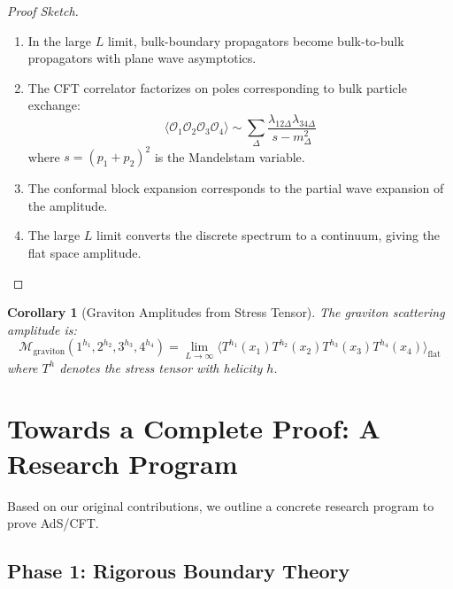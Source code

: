 \documentclass[12pt,a4paper]{article}
\newtheorem{corollary}[theorem]{Corollary}
\begin{document}
\begin{proof}[Proof Sketch]
\begin{enumerate}
    \item In the large $L$ limit, bulk-boundary propagators become bulk-to-bulk propagators with plane wave asymptotics.
    
    \item The CFT correlator factorizes on poles corresponding to bulk particle exchange:
    \begin{equation}
    \langle \mathcal{O}_1 \mathcal{O}_2 \mathcal{O}_3 \mathcal{O}_4 \rangle \sim \sum_{\Delta} \frac{\lambda_{12\Delta}\lambda_{34\Delta}}{s - m_\Delta^2}
    \end{equation}
    where $s = (p_1 + p_2)^2$ is the Mandelstam variable.
    
    \item The conformal block expansion corresponds to the partial wave expansion of the amplitude.
    
    \item The large $L$ limit converts the discrete spectrum to a continuum, giving the flat space amplitude.
\end{enumerate}
\end{proof}

\begin{corollary}[Graviton Amplitudes from Stress Tensor]
The graviton scattering amplitude is:
\begin{equation}
\mathcal{M}_{\text{graviton}}(1^{h_1}, 2^{h_2}, 3^{h_3}, 4^{h_4}) = \lim_{L \to \infty} \langle T^{h_1}(x_1) T^{h_2}(x_2) T^{h_3}(x_3) T^{h_4}(x_4) \rangle_{\text{flat}}
\end{equation}
where $T^h$ denotes the stress tensor with helicity $h$.
\end{corollary}

\section{Towards a Complete Proof: A Research Program}

Based on our original contributions, we outline a concrete research program to prove AdS/CFT.

\subsection{Phase 1: Rigorous Boundary Theory}
\end{document}
